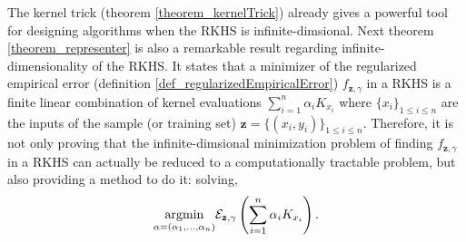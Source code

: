 The kernel trick (theorem \ref{theorem_kernelTrick}) already gives a powerful tool for designing algorithms when the RKHS is infinite\hyp{}dimsional. Next theorem \ref{theorem_representer} is also a remarkable result regarding infinite\hyp{}dimensionality of the RKHS. It states that a minimizer of the regularized empirical error (definition \ref{def_regularizedEmpiricalError}) $f_{\pmb{z},\gamma}$ in a RKHS is a finite linear combination of kernel evaluations $\sum_{i=1}^n \alpha_i K_{x_i}$ where $\{x_i\}_{1 \leq i \leq n}$ are the inputs of the sample (or training set) $\pmb{z} = \{(x_i,y_i)\}_{1 \leq i \leq n}$. Therefore, it is not only proving that the infinite\hyp{}dimsional minimization problem of finding $f_{\pmb{z},\gamma}$ in a RKHS can actually be reduced to a computationally tractable problem, but also providing a method to do it: solving,
\begin{equation*}
  \underset{\alpha = (\alpha_1, \dots, \alpha_n)}{\textup{argmin}} \mathcal{E}_{\pmb{z},\gamma} \left( \sum_{i=1}^n \alpha_i K_{x_i} \right).
\end{equation*}

